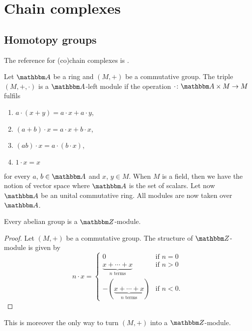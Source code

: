 					\section{Chain complexes}

					\subsection{Homotopy groups}

The reference for (co)chain complexes is \cite{TopoPaulin}. 

Let $\eA$ be a ring and $(M,+)$ be a commutative group. The triple $(M,+,\cdot)$ is a $\eA$-left module if the operation $\cdot\colon \eA\times M\to M$ fulfils
\begin{enumerate}
\item $a\cdot (x+y)=a\cdot x+a\cdot y$,
\item $(a+b)\cdot x=a\cdot x+b\cdot x$,
\item $(ab)\cdot x=a\cdot(b\cdot x)$,
\item $1\cdot x=x$
\end{enumerate}
for every $a$, $b\in \eA$ and $x$, $y\in M$. When $M$ is a field, then we have the notion of vector space where $\eA$ is the set of scalars. Let now $\eA$ be an unital commutative ring. All modules are now taken over $\eA$.

\begin{proposition}
Every abelian group is a $\eZ$-module.
\end{proposition}

\begin{proof}
Let $(M,+)$ be a commutative group. The structure of $\eZ$-module is given by
\[ 
  n\cdot x=
\begin{cases}
			0						&\text{if $n=0$}\\
			\underbrace{x+\cdots+x	}_{\text{$n$ terms}}	&\text{if $n>0$}\\
			-(\underbrace{x+\cdots+x}_{\text{$n$ terms}})	&\text{if $n<0$.}
\end{cases}
\]
\end{proof}
This is moreover the only way to turn $(M,+)$ into a $\eZ$-module.

